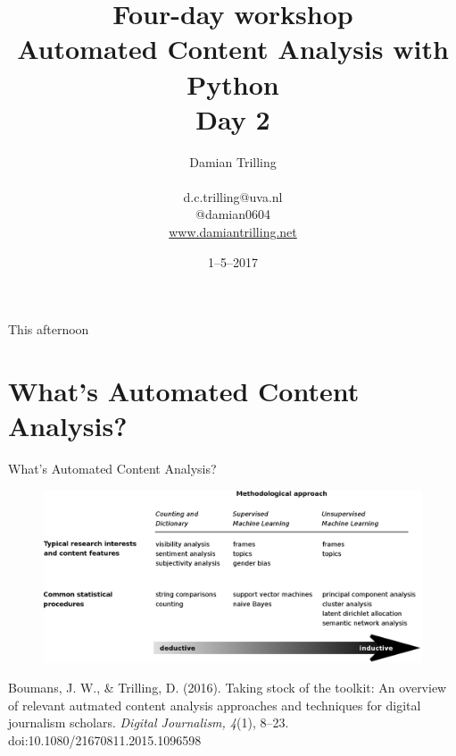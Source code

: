 \documentclass{beamer}
\begin{document}
\title[Automated Content Analysis with Python]{\textbf{Four-day workshop\\ Automated Content Analysis with Python} \\ Day 2}
\author[Damian Trilling]{Damian Trilling \\ ~ \\ \footnotesize{d.c.trilling@uva.nl \\@damian0604} \\ \url{www.damiantrilling.net}}
\date{1--5--2017}



\begin{frame}{}
\titlepage
\end{frame}

\begin{frame}{This afternoon}
\tableofcontents
\end{frame}



\section[What's ACA?]{What's Automated Content Analysis?}
\begin{frame}[plain]
	What's Automated Content Analysis?
\end{frame}


\begin{frame}[plain]
\begin{figure}
\centering
\includegraphics[width=1.0\linewidth]{boumanstrilling2016}
\label{fig:boumanstrilling2016}
\end{figure}
\tiny{Boumans, J. W., \& Trilling, D. (2016). Taking stock of the toolkit: An overview of relevant autmated content analysis approaches and techniques for digital journalism scholars. \emph{Digital Journalism, 4}(1), 8–23. doi:10.1080/21670811.2015.1096598}
\end{frame}
\end{document}
